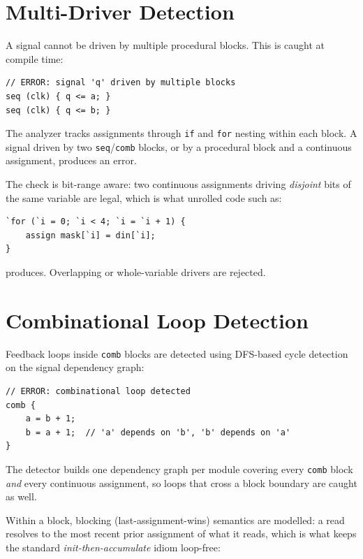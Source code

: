 \documentclass[lang=en,11pt]{elegantbook}
\newcommand{\code}[1]{\texttt{#1}}
\begin{document}
\section{Multi-Driver Detection}

A signal cannot be driven by multiple procedural blocks. This is caught at compile time:

\begin{lstlisting}[language=Slip]
// ERROR: signal 'q' driven by multiple blocks
seq (clk) { q <= a; }
seq (clk) { q <= b; }
\end{lstlisting}

The analyzer tracks assignments through \code{if} and \code{for} nesting within each block. A signal driven by two \code{seq}/\code{comb} blocks, or by a procedural block and a continuous assignment, produces an error.

The check is bit-range aware: two continuous assignments driving \emph{disjoint} bits of the same variable are legal, which is what unrolled code such as:

\begin{lstlisting}[language=Slip]
`for (`i = 0; `i < 4; `i = `i + 1) {
    assign mask[`i] = din[`i];
}
\end{lstlisting}

produces. Overlapping or whole-variable drivers are rejected.

\section{Combinational Loop Detection}

Feedback loops inside \code{comb} blocks are detected using DFS-based cycle detection on the signal dependency graph:

\begin{lstlisting}[language=Slip]
// ERROR: combinational loop detected
comb {
    a = b + 1;
    b = a + 1;  // 'a' depends on 'b', 'b' depends on 'a'
}
\end{lstlisting}

The detector builds one dependency graph per module covering every \code{comb} block \emph{and} every continuous assignment, so loops that cross a block boundary are caught as well.

Within a block, blocking (last-assignment-wins) semantics are modelled: a read resolves to the most recent prior assignment of what it reads, which is what keeps the standard \emph{init-then-accumulate} idiom loop-free:
\end{document}
